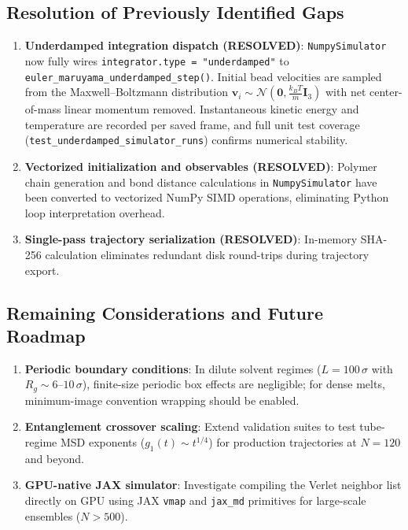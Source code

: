 \documentclass[12pt,a4paper]{article}
\newcommand{\code}[1]{\texttt{#1}}
\begin{document}
\subsection{Resolution of Previously Identified Gaps}
\begin{enumerate}[label=\alph*)]
  \item \textbf{Underdamped integration dispatch (RESOLVED)}: \code{NumpySimulator} now fully wires
        \code{integrator.type = "underdamped"} to \code{euler\_maruyama\_underdamped\_step()}.
        Initial bead velocities are sampled from the Maxwell--Boltzmann distribution
        $\mathbf{v}_i \sim \mathcal{N}(\mathbf{0}, \frac{k_B T}{m} \mathbf{I}_3)$ with net
        center-of-mass linear momentum removed. Instantaneous kinetic energy and temperature are
        recorded per saved frame, and full unit test coverage (\code{test\_underdamped\_simulator\_runs})
        confirms numerical stability.
  \item \textbf{Vectorized initialization and observables (RESOLVED)}: Polymer chain generation
        and bond distance calculations in \code{NumpySimulator} have been converted to vectorized
        NumPy SIMD operations, eliminating Python loop interpretation overhead.
  \item \textbf{Single-pass trajectory serialization (RESOLVED)}: In-memory SHA-256 calculation
        eliminates redundant disk round-trips during trajectory export.
\end{enumerate}

\subsection{Remaining Considerations and Future Roadmap}
\begin{enumerate}[label=\arabic*)]
  \item \textbf{Periodic boundary conditions}: In dilute solvent regimes ($L=100\,\sigma$ with
        $R_g \sim 6$--$10\,\sigma$), finite-size periodic box effects are negligible; for dense melts,
        minimum-image convention wrapping should be enabled.
  \item \textbf{Entanglement crossover scaling}: Extend validation suites to test tube-regime MSD
        exponents ($g_1(t) \sim t^{1/4}$) for production trajectories at $N=120$ and beyond.
  \item \textbf{GPU-native JAX simulator}: Investigate compiling the Verlet neighbor list directly
        on GPU using JAX \code{vmap} and \code{jax\_md} primitives for large-scale ensembles ($N > 500$).
\end{enumerate}
\end{document}
